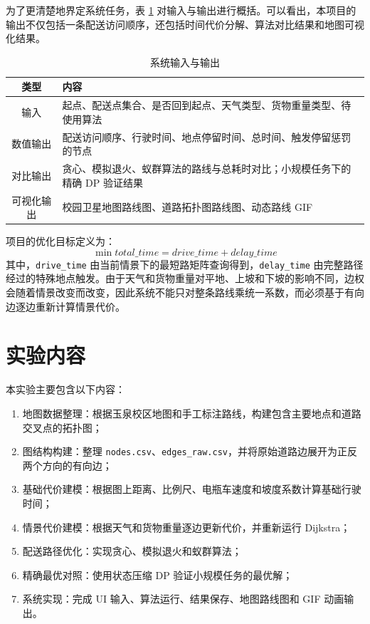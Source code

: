\documentclass[12pt,a4paper,UTF8]{article}
\begin{document}
为了更清楚地界定系统任务，表 \ref{tab:io_summary} 对输入与输出进行概括。可以看出，本项目的输出不仅包括一条配送访问顺序，还包括时间代价分解、算法对比结果和地图可视化结果。

\begin{table}[H]
\centering
\caption{系统输入与输出}
\label{tab:io_summary}
\small
\renewcommand{\arraystretch}{1.2}
\begin{tabularx}{\textwidth}{c|X}
\hline
类型 & 内容 \\
\hline
输入 & 起点、配送点集合、是否回到起点、天气类型、货物重量类型、待使用算法 \\
\hline
数值输出 & 配送访问顺序、行驶时间、地点停留时间、总时间、触发停留惩罚的节点 \\
\hline
对比输出 & 贪心、模拟退火、蚁群算法的路线与总耗时对比；小规模任务下的精确 DP 验证结果 \\
\hline
可视化输出 & 校园卫星地图路线图、道路拓扑图路线图、动态路线 GIF \\
\hline
\end{tabularx}
\end{table}

项目的优化目标定义为：
\[
    \min total\_time = drive\_time + delay\_time
\]
其中，\verb|drive_time| 由当前情景下的最短路矩阵查询得到，\verb|delay_time| 由完整路径经过的特殊地点触发。由于天气和货物重量对平地、上坡和下坡的影响不同，边权会随着情景改变而改变，因此系统不能只对整条路线乘统一系数，而必须基于有向边逐边重新计算情景代价。

\section{实验内容}

本实验主要包含以下内容：
\begin{enumerate}[label=(\arabic*)]
    \item 地图数据整理：根据玉泉校区地图和手工标注路线，构建包含主要地点和道路交叉点的拓扑图；
    \item 图结构构建：整理 \texttt{nodes.csv}、\texttt{edges\_raw.csv}，并将原始道路边展开为正反两个方向的有向边；
    \item 基础代价建模：根据图上距离、比例尺、电瓶车速度和坡度系数计算基础行驶时间；
    \item 情景代价建模：根据天气和货物重量逐边更新代价，并重新运行 Dijkstra；
    \item 配送路径优化：实现贪心、模拟退火和蚁群算法；
    \item 精确最优对照：使用状态压缩 DP 验证小规模任务的最优解；
    \item 系统实现：完成 UI 输入、算法运行、结果保存、地图路线图和 GIF 动画输出。
\end{enumerate}
\end{document}

